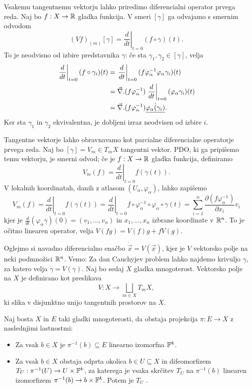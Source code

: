 Vsakemu tangentnemu vektorju lahko priredimo diferencialni operator prvega reda.
Naj bo $f: X \to \mathbb{R}$ gladka funkcija.
V smeri $[\gamma]$ ga odvajamo s smernim odvodom
\[
  (Vf)_{(m)} [\gamma] = \left. \frac{d}{dt} \right|_{t=0} (f \circ \gamma)(t).
\]
To je neodvisno od izbire predstavnika $\gamma$:
če sta $\gamma_1, \gamma_2 \in [\gamma]$, velja
\begin{align*}
  \left. \frac{d}{dt} \right|_{t=0} (f \circ \gamma_i)(t)
  &= \left. \frac{d}{dt} \right|_{t=0} (f \varphi_\alpha^{-1} \varphi_\alpha
  \gamma_i)(t) \\
  &= \vec{\nabla}{} .(f \varphi_\alpha^{-1}) \left. \frac{d}{dt} \right|_{t=0}
  (\varphi_\alpha \gamma_i)(t) \\
  &= \vec{\nabla}{} .(f \varphi_\alpha^{-1}) \dot{\underline{\varphi_\alpha(\gamma_i)}}.
\end{align*}
Ker sta $\gamma_1$ in $\gamma_2$ ekvivalentna, je dobljeni izraz neodvisen od
izbire $i$.

Tangentne vektorje lahko obravnavamo kot parcialne diferencialne operatorje
prvega reda.
Naj bo $[\gamma] = V_m \in T_m X$ tangentni vektor.
PDO, ki ga pripišemo temu vektorju, je smerni odvod; če je $f: X \to \mathbb{R}$ gladka
funkcija, definiramo
\[
  V_m(f) = \left. \frac{d}{dt} \right|_{t=0} f(\gamma(t)).
\]
V lokalnih koordinatah, danih z atlasom $(U_\alpha, \varphi_\alpha)$, lahko zapišemo
\[
  V_m(f) = \left. \frac{d}{dt} \right|_{t=0} f(\gamma(t))
  = \left. \frac{d}{dt} \right|_{t=0} f \circ \varphi_\alpha^{-1} \circ
  \varphi_\alpha \circ \gamma(t)
  = \sum_{i=1}^n \frac{\partial (f \varphi_\alpha^{-1})}{\partial x_i}
  v_i
\]
kjer je $\frac{d}{dt}(\varphi_\alpha \gamma)(0) = (v_1, \ldots, v_n)$ in $x_1,
\ldots, x_n$ izbrane koordinate v $\mathbb{R}^n$.
To je očitno linearen operator, velja $V(fg) = V(f) g + f V(g)$.


Oglejmo si navadno diferencialno enačbo $\dot{\vec{x}} = V(\vec{x})$, kjer je
$V$ vektorsko polje na neki podmnožici $\mathbb{R}^n$.
Vemo:
Za dan Cauchyjev problem lahko najdemo krivuljo $\gamma$, za katero velja
$\dot{\gamma} = V(\gamma)$.
Naj bo sedaj $X$ gladka mnogoterost.
Vektorsko polje na $X$ je definirano kot preslikava
\[
  V: X \to \bigsqcup_{m \in X} T_m X,
\]
ki slika v disjunktno unijo tangentnih prostorov na $X$.

\begin{definicija}
  Naj bosta $X$ in $E$ taki gladki mnogoterosti, da obstaja projekcija
  $\pi: E \to X$ z naslednjimi lastnostmi:
  \begin{itemize}
  \item Za vsak $b \in X$ je $\pi^{-1}(b) \subseteq E$ linearno izomorfna
	$\mathbb{F}^k$.
  \item Za vsak $b \in X$ obstaja odprta okolica $b \in U \subseteq X$ in
	difeomorfizem $T_U: \pi^{-1}(U) \to U \times \mathbb{F}^k$, za katerega je vsaka
	skrčitev $T_U$ na $\pi^{-1}(b)$ linearen izomorfizem $\pi^{-1}(b)
	\to b \times \mathbb{F}^k$.
	Potem je $T_U$ .
  \end{itemize}
\end{definicija}

